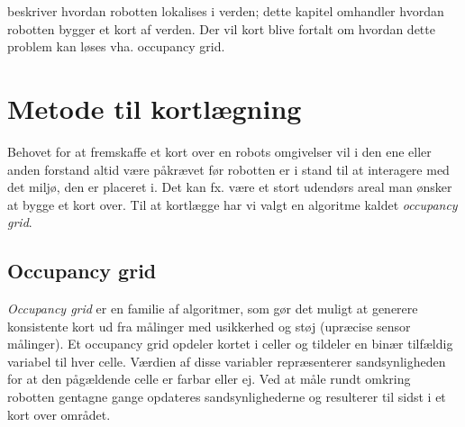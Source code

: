  beskriver hvordan robotten lokalises i verden; dette kapitel omhandler hvordan robotten bygger et kort af verden.
Der vil kort blive fortalt om hvordan dette problem kan løses vha. occupancy grid.

\section{Metode til kortlægning}
Behovet for at fremskaffe et kort over en robots omgivelser vil i den ene eller anden forstand altid være påkrævet før robotten er i stand til at interagere med det miljø, den er placeret i.
Det kan fx. være et stort udendørs areal man ønsker at bygge et kort over.
Til at kortlægge har vi valgt en algoritme kaldet \textit{occupancy grid}. 

\subsection{Occupancy grid}
\textit{Occupancy grid} er en familie af algoritmer, som gør det muligt at generere konsistente kort ud fra målinger med usikkerhed og støj (upræcise sensor målinger).
Et occupancy grid opdeler kortet i celler og tildeler en binær tilfældig variabel til hver celle.
Værdien af disse variabler repræsenterer sandsynligheden for at den pågældende celle er farbar eller ej.
Ved at måle rundt omkring robotten gentagne gange opdateres sandsynlighederne og resulterer til sidst i et kort over området.